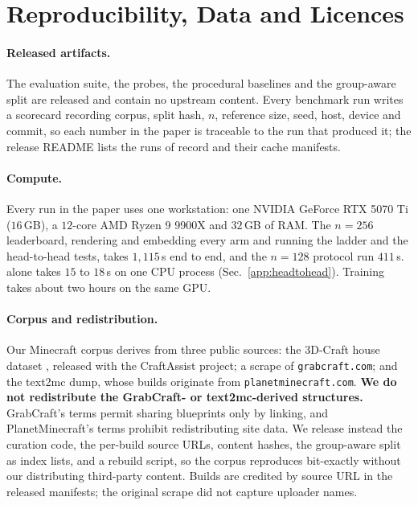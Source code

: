 \section{Reproducibility, Data and Licences}
\label{app:data}

\paragraph{Released artifacts.} The evaluation suite, the probes, the procedural
baselines and the group-aware split are released and contain no upstream content.
Every benchmark run writes a scorecard recording corpus, split hash, $n$,
reference size, seed, host, device and commit, so each number in the paper is
traceable to the run that produced it; the release README lists the runs of
record and their cache manifests. 

\paragraph{Compute.} Every run in the paper uses one workstation: one NVIDIA
GeForce RTX 5070 Ti ($16$\,GB), a $12$-core AMD Ryzen 9 9900X and $32$\,GB of RAM.
The $n{=}256$ leaderboard, rendering and embedding every arm and running the
ladder and the head-to-head tests, takes $1{,}115$\,s end to end, and the
$n{=}128$ protocol run $411$\,s. \vkid{} alone takes $15$ to $18$\,s on one CPU
process (Sec.~\ref{app:headtohead}). Training \voxar{} takes about two hours on
the same GPU.

\paragraph{Corpus and redistribution.} Our Minecraft corpus derives from three
public sources: the 3D-Craft house dataset \citep{chen2019voxelcnn,gray2019craftassist},
released with the CraftAssist project; a scrape of \texttt{grabcraft.com}; and the
text2mc dump, whose builds originate from \texttt{planetminecraft.com}. \textbf{We
do not redistribute the GrabCraft- or text2mc-derived structures.} GrabCraft's
terms permit sharing blueprints only by linking, and PlanetMinecraft's terms
prohibit redistributing site data. We release instead the curation code, the
per-build source URLs, content hashes, the group-aware split as index lists, and
a rebuild script, so the corpus reproduces bit-exactly without our distributing
third-party content. Builds are credited by source URL in the released
manifests; the original scrape did not capture uploader names.

